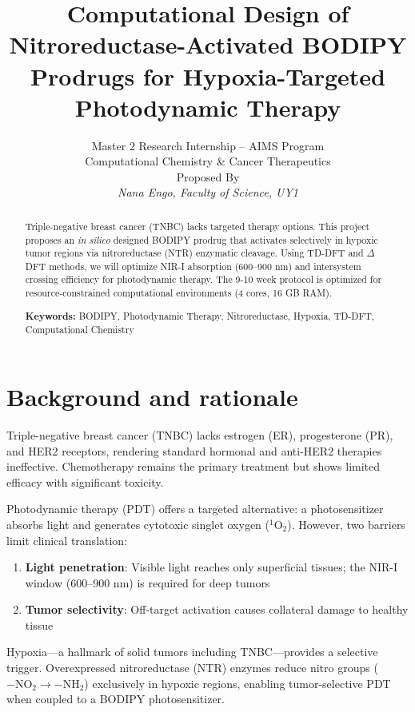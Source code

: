 \documentclass[12pt,a4paper]{article}
\title{\Large\textbf{Computational Design of Nitroreductase-Activated BODIPY Prodrugs for Hypoxia-Targeted Photodynamic Therapy}}
\author{Master 2 Research Internship -- AIMS Program\\Computational Chemistry \& Cancer Therapeutics\\
Proposed By \\\textit{Nana Engo, Faculty of Science, UY1}}
\date{}
\begin{document}
\maketitle

\begin{abstract}
Triple-negative breast cancer (TNBC) lacks targeted therapy options. This project proposes an \textit{in silico} designed BODIPY prodrug that activates selectively in hypoxic tumor regions via nitroreductase (NTR) enzymatic cleavage. Using TD-DFT and $\Delta$DFT methods, we will optimize NIR-I absorption (600--900 nm) and intersystem crossing efficiency for photodynamic therapy. The 9-10 week protocol is optimized for resource-constrained computational environments (4 cores, 16 GB RAM).

\vspace{0.5em}
\noindent\textbf{Keywords:} BODIPY, Photodynamic Therapy, Nitroreductase, Hypoxia, TD-DFT, Computational Chemistry
\end{abstract}

\section{Background and rationale}

Triple-negative breast cancer (TNBC) lacks estrogen (ER), progesterone (PR), and HER2 receptors, rendering standard hormonal and anti-HER2 therapies ineffective. Chemotherapy remains the primary treatment but shows limited efficacy with significant toxicity.

Photodynamic therapy (PDT) offers a targeted alternative: a photosensitizer absorbs light and generates cytotoxic singlet oxygen ($^1\text{O}_2$). However, two barriers limit clinical translation:
\begin{enumerate}
  \item \textbf{Light penetration}: Visible light reaches only superficial tissues; the NIR-I window (600--900 nm) is required for deep tumors
  \item \textbf{Tumor selectivity}: Off-target activation causes collateral damage to healthy tissue
\end{enumerate}

Hypoxia---a hallmark of solid tumors including TNBC---provides a selective trigger. Overexpressed nitroreductase (NTR) enzymes reduce nitro groups ($-\text{NO}_2 \rightarrow -\text{NH}_2$) exclusively in hypoxic regions, enabling tumor-selective PDT when coupled to a BODIPY photosensitizer.
\end{document}
